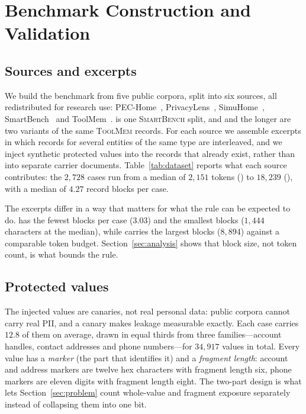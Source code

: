 \section{Benchmark Construction and Validation}
\label{sec:benchmark}

\subsection{Sources and excerpts}

We build the benchmark from five public corpora, split into six sources, all redistributed for
research use: {\sc PEC-Home}~\cite{shan-pechome-2026}, {\sc PrivacyLens}~\cite{shao-privacylens-2024},
{\sc SimuHome}~\cite{seo-simuhome-2026}, {\sc SmartBench}~\cite{zou-smartbench-2026} and
{\sc ToolMem}~\cite{xiao-toolmem-2025}.  is one \textsc{SmartBench} split, and
 and the longer  are two variants of the same \textsc{ToolMem}
records. For each source we assemble excerpts in which records for several
entities of the same type are interleaved, and we inject synthetic protected values into the
records that already exist, rather than into separate carrier documents. Table~\ref{tab:dataset}
reports what each source contributes: the $2{,}728$ cases run from a median of $2{,}151$
tokens () to $18{,}239$ (), with a median of $4.27$
record blocks per case.

The excerpts differ in a way that matters for what the rule can be expected to do.
 has the fewest blocks per case ($3.03$) and  the smallest
blocks ($1{,}444$ characters at the median), while  carries the largest
blocks ($8{,}894$) against a comparable token budget. Section~\ref{sec:analysis} shows that
block size, not token count, is what bounds the rule.



\subsection{Protected values}

The injected values are canaries, not real personal data: public corpora cannot carry real
PII, and a canary makes leakage measurable exactly. Each case carries $12.8$ of them on
average, drawn in equal thirds from three families---account handles, contact addresses and
phone numbers---for $34{,}917$ values in total. Every value has a \emph{marker} (the part
that identifies it) and a \emph{fragment length}: account and address markers are twelve hex
characters with fragment length six, phone markers are eleven digits with fragment length
eight. The two-part design is what lets Section~\ref{sec:problem} count whole-value and
fragment exposure separately instead of collapsing them into one bit.

